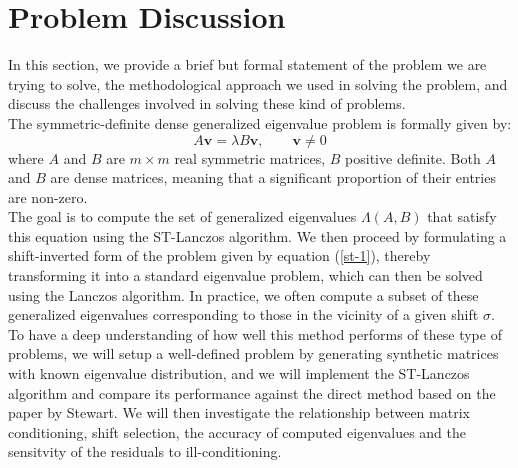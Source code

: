 \documentclass[12pt,gsu,online,openany,singleside,hidelinks]{gsudiss}
\newcommand{\comm}[1]{\added[comment={#1}]{}}
\begin{document}
\section{Problem Discussion}
\comm{It seems disconnected to have a discussion of the problem here after having a discussion of the generalized eigenvalue problem in an earlier section.  I'd move everything into that earlier section and add more material on the symmetric (or hermitian) definite generalized eigenvalue problem.  There are several things missing, like the fact that for the symmetric definite problem, the matrices are simultaneously congruent to a diagonal.  Then in the previous section on the spectral transformation, you could state the full theorem that I had in my paper relating the eigenvalues and eigenvectors of the original problem to the eigenvalues and eigenvectors of the shifted problem.}
In this section, we provide a brief but formal statement of the problem we are trying to solve, the methodological approach we used in solving the problem, and discuss the challenges involved in solving these kind of problems.\\[5pt]

The symmetric-definite dense generalized eigenvalue problem is formally given by:
\begin{equation}\label{1.18}
	A\mathbf{v} = \lambda B\mathbf{v}, \qquad \mathbf{v} \neq 0
\end{equation}
where $A$ and $B$ are $m \times m$ real symmetric matrices, $B$ positive definite. Both $A$ and $B$ are dense matrices, meaning that a significant proportion of their entries are non-zero.\\[5pt]
The goal is to compute the set of generalized eigenvalues $\Lambda(A, B)$ that satisfy this equation using the ST-Lanczos algorithm. We then proceed by formulating a shift-inverted form of the problem given by equation (\ref{st-1}), thereby transforming it into a standard eigenvalue problem, which can then be solved using the Lanczos algorithm. In practice, we often compute a subset of these generalized eigenvalues corresponding to those in the vicinity of a given shift $\sigma$. To have a deep understanding of how well this method performs of these type of problems, we will setup a well-defined problem by generating synthetic matrices with known eigenvalue distribution, and we will implement the ST-Lanczos algorithm and compare its performance against the direct method based on the paper by Stewart. We will then investigate the relationship between matrix conditioning, shift selection, the accuracy of computed eigenvalues and the sensitvity of the residuals to ill-conditioning.
\end{document}
